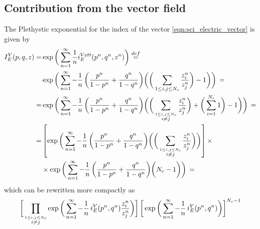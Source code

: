 \begin{appendices}
\subsection{Contribution from the vector field}
The Plethystic exponential for the index of the vector \eqref{eqn:sci_electric_vector} is given by
\begin{equation}
\begin{aligned}
I_E^V(p,q,z) = &\exp \bigg( \sum_{n=1}^{\infty} {1 \over n} i_E^{Vett} (p^n,q^n,z^n) \bigg) \overset{def}{=} \\
 &\exp \bigg( \sum_{n=1}^{\infty} - {1 \over n} \, \bigg( {p^n \over 1-p^n} + {q^n \over 1-q^n} \bigg)  \bigg(\bigg( \sum_{ 1 \leq i,j \leq N_c}  {z_i^n \over z_j^n}  \bigg)- 1 \bigg) \bigg) \, = \\
 =&\exp \bigg( \sum_{n=1}^{\infty} - {1 \over n} \, \bigg( {p^n \over 1-p^n} + {q^n \over 1-q^n} \bigg)  \bigg( \bigg( \sum_{\overset{ 1 \leq i,j \leq N_c}{i \neq j}}  {z_i^n \over z_j^n} \bigg) + \bigg( \sum_{i=1}^{N_c} 1 \bigg)- 1 \bigg) \bigg) \, = \\
=&
\left[  \exp \bigg( \sum_{n=1}^{\infty} - {1 \over n} \, \bigg( {p^n \over 1-p^n} + {q^n \over 1-q^n} \bigg)  \bigg( \bigg( \sum_{\overset{ 1 \leq i,j \leq N_c}{i \neq j}}  {z_i^n \over z_j^n} \bigg) \bigg)\right] \times \\
	&   \times \exp \bigg( \sum_{n=1}^{\infty} - {1 \over n} \, \bigg( {p^n \over 1-p^n} + {q^n \over 1-q^n} \bigg)  \bigg( N_c - 1 \bigg) \bigg) \, = 
\\
\end{aligned}
\end{equation}
which can be rewritten more compactly as
\begin{equation}
\bigg[\prod_{\overset{ 1 \leq i,j \leq N_c}{i\neq j}} \exp \bigg( \sum_{n=1}^{\infty} - {1 \over n} \, i_E^V(p^n,q^n)  {z_i^n \over z_j^n}\bigg) \bigg] \,
\bigg[ \exp \bigg( \sum_{n=1}^{\infty} - {1 \over n} \,  i_E^V(p^n,q^n) \bigg) \bigg] ^{N_c-1}

\end{equation}
\end{appendices}
